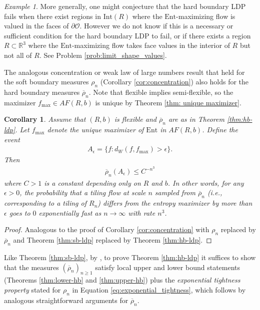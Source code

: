 \documentclass[11pt]{article}
\newtheorem{cor}[thm]{Corollary}
\theoremstyle{remark}
\newtheorem{exmp}[thm]{Example}
\theoremstyle{definition}
\newcommand{\Ent}{\text{Ent}}
\newcommand{\mc}[1]{\mathcal{#1}}
\newcommand{\m}[1]{\mathbb{#1}}
\begin{document}
\begin{exmp}
    More generally, one might conjecture that the hard boundary LDP fails when there exist regions in $\text{Int}(R)$ where the $\Ent$-maximizing flow is valued in the faces of $\partial \mc O$. However we do not know if this is a necessary or sufficient condition for the hard boundary LDP to fail, or if there exists a region $R\subset \m R^3$ where the $\Ent$-maximizing flow takes face values in the interior of $R$ but not all of $R$. See Problem \ref{prob:limit_shape_values}.
\end{exmp}

The analogous concentration or weak law of large numbers result that held for the soft boundary measures $\rho_n$ (Corollary \ref{cor:concentration}) also holds for the hard boundary measures $\overline{\rho}_n$. Note that flexible implies semi-flexible, so the maximizer $f_{\max}\in AF(R,b)$ is unique by Theorem \ref{thm: unique maximizer}.
\begin{cor}\label{cor:concentration-hb}
    Assume that $(R,b)$ is flexible and $\overline{\rho}_n$ are as in Theorem \ref{thm:hb-ldp}. Let $f_{\max}$ denote the unique maximizer of $\Ent$ in $AF(R,b)$. Define the event
\begin{align*} 
A_{\epsilon} = \{f : d_W(f,f_{\max})>\epsilon\}.
\end{align*}
Then
\begin{align*}
    \overline{\rho}_n(A_{\epsilon}) \leq C^{-n^3}
\end{align*}
where $C>1$ is a constant depending only on $R$ and $b$. In other words, for any $\epsilon>0$, the probability that a tiling flow at scale $n$ sampled from $\overline{\rho}_n$ (i.e., corresponding to a tiling of $R_n$) differs from the entropy maximizer by more than $\epsilon$ goes to $0$ exponentially fast as $n\to \infty$ with rate $n^3$.
\end{cor}
\begin{proof}
    Analogous to the proof of Corollary \ref{cor:concentration} with $\rho_n$ replaced by $\overline{\rho}_n$ and Theorem \ref{thm:sb-ldp} replaced by Theorem \ref{thm:hb-ldp}.
\end{proof}

Like Theorem \ref{thm:sb-ldp}, by \cite[Lemma 2.3]{varadhan2016large}, to prove Theorem \ref{thm:hb-ldp} it suffices to show that the measures $(\overline{\rho}_n)_{n\geq 1}$ satisfy local upper and lower bound statements (Theorems \ref{thm:lower-hb} and \ref{thm:upper-hb}) plus the \textit{exponential tightness property} stated for $\rho_n$ in Equation \eqref{eq:exponential_tightness}, which follows by analogous straightforward arguments for $\overline{\rho}_n$. 
\end{document}
